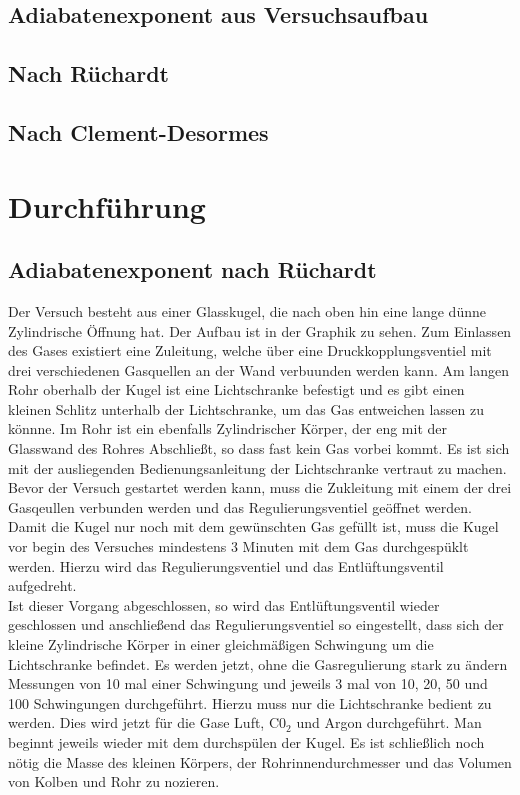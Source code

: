 \documentclass[12pt,a4paper,titlepage,headinclude,bibtotoc]{scrartcl}
\begin{document}
\subsection{Adiabatenexponent aus Versuchsaufbau}

\subsection{Nach Rüchardt}

\subsection{Nach Clement-Desormes}

\cite[S.$\infty$]{prakti}

\section{Durchführung}
\label{sec:durchfuehrung}

\subsection{Adiabatenexponent nach Rüchardt}
Der Versuch besteht aus einer Glasskugel, die nach oben hin eine lange dünne Zylindrische Öffnung hat.
Der Aufbau ist in der Graphik %
zu sehen.
Zum Einlassen des Gases existiert eine Zuleitung, welche über eine Druckkopplungsventiel mit drei verschiedenen Gasquellen an der Wand verbuunden werden kann.
Am langen Rohr oberhalb der Kugel ist eine Lichtschranke befestigt und es gibt einen kleinen Schlitz unterhalb der Lichtschranke, um das Gas entweichen lassen zu könnne.
Im Rohr ist ein ebenfalls Zylindrischer Körper, der eng mit der Glasswand des Rohres Abschließt, so dass fast kein Gas vorbei kommt.
Es ist sich mit der ausliegenden Bedienungsanleitung der Lichtschranke vertraut zu machen.\\
Bevor der Versuch gestartet werden kann, muss die Zukleitung mit einem der drei Gasqeullen verbunden werden und das Regulierungsventiel geöffnet werden.
Damit die Kugel nur noch mit dem gewünschten Gas gefüllt ist, muss die Kugel vor begin des Versuches mindestens 3 Minuten mit dem Gas durchgespüklt werden.
Hierzu wird das Regulierungsventiel und das Entlüftungsventil aufgedreht.\\
Ist dieser Vorgang abgeschlossen, so wird das Entlüftungsventil wieder geschlossen und anschließend das Regulierungsventiel so eingestellt, dass sich der kleine Zylindrische Körper in einer gleichmäßigen Schwingung um die Lichtschranke befindet.
Es werden jetzt, ohne die Gasregulierung stark zu ändern Messungen von 10 mal einer Schwingung und jeweils 3 mal von 10, 20, 50 und 100 Schwingungen durchgeführt.
Hierzu muss nur die Lichtschranke bedient zu werden.
Dies wird jetzt für die Gase Luft, C0$_2$ und Argon durchgeführt.
Man beginnt jeweils wieder mit dem durchspülen der Kugel.
Es ist schließlich noch nötig die Masse des kleinen Körpers, der Rohrinnendurchmesser und das Volumen von Kolben und Rohr zu nozieren.
\end{document}
